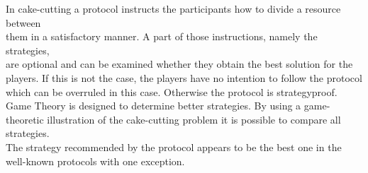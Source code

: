 In cake-cutting a protocol instructs the participants how to divide a resource between\\them in a satisfactory manner. A part of those instructions, namely the strategies,\\are optional and can be examined whether they obtain the best solution for the players. If this is not the case, the players have no intention to follow the protocol which can be overruled in this case. Otherwise the protocol is strategyproof.\\Game Theory is designed to determine better strategies. By using a game-theoretic illustration of the cake-cutting problem it is possible to compare all strategies.\\The strategy recommended by the protocol appears to be the best one in the well-known protocols with one exception.  



